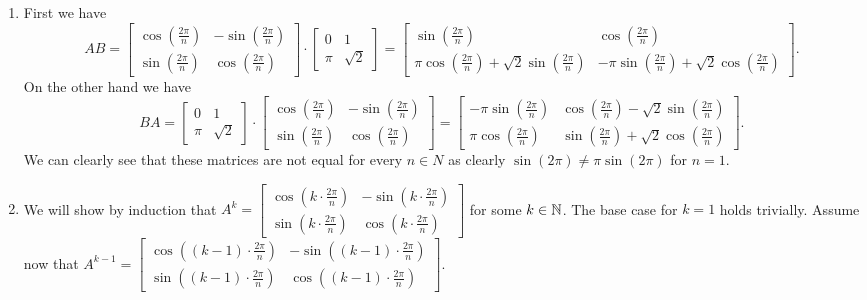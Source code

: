 \documentclass{article}
\begin{document}
\begin{solution}
  \begin{enumerate}[label=(\alph*)]
    \item First we have
        \[AB = \begin{bmatrix} \cos(\frac{2 \pi}{n}) & -\sin(\frac{2 \pi}{n})\\ \sin(\frac{2 \pi}{n}) & \cos(\frac{2 \pi}{n}) \end{bmatrix} \cdot \begin{bmatrix} 0 & 1\\ \pi & \sqrt{2} \end{bmatrix} = \begin{bmatrix} \sin(\frac{2 \pi}{n}) & \cos(\frac{2 \pi}{n})\\ \pi \cos(\frac{2 \pi}{n}) + \sqrt{2} \sin(\frac{2 \pi}{n}) & -\pi \sin(\frac{2 \pi}{n}) + \sqrt{2} \cos(\frac{2 \pi}{n}) \end{bmatrix}.\]
        On the other hand we have
        \[BA = \begin{bmatrix} 0 & 1\\ \pi & \sqrt{2} \end{bmatrix} \cdot \begin{bmatrix} \cos(\frac{2 \pi}{n}) & -\sin(\frac{2 \pi}{n})\\ \sin(\frac{2 \pi}{n}) & \cos(\frac{2 \pi}{n}) \end{bmatrix} = \begin{bmatrix} - \pi \sin(\frac{2 \pi}{n}) & \cos(\frac{2 \pi}{n}) - \sqrt{2} \sin(\frac{2 \pi}{n})\\ \pi \cos(\frac{2 \pi}{n}) & \sin(\frac{2 \pi}{n}) + \sqrt{2} \cos(\frac{2 \pi}{n}) \end{bmatrix}.\]
        We can clearly see that these matrices are not equal for every $n \in N$ as clearly $\sin(2 \pi) \neq \pi \sin(2 \pi)$ for $n = 1$.
    \item We will show by induction that $A^k = \begin{bmatrix} \cos(k \cdot \frac{2 \pi}{n}) & -\sin(k \cdot \frac{2 \pi}{n})\\ \sin(k \cdot \frac{2 \pi}{n}) & \cos(k \cdot \frac{2 \pi}{n}) \end{bmatrix}$ for some $k \in \mathbb{N}$.
        The base case for $k = 1$ holds trivially.
        Assume now that $A^{k - 1} = \begin{bmatrix} \cos((k - 1) \cdot \frac{2 \pi}{n}) & -\sin((k - 1) \cdot \frac{2 \pi}{n})\\ \sin((k - 1) \cdot \frac{2 \pi}{n}) & \cos((k - 1) \cdot \frac{2 \pi}{n}) \end{bmatrix}$.

\end{enumerate}
\end{solution}
\end{document}
